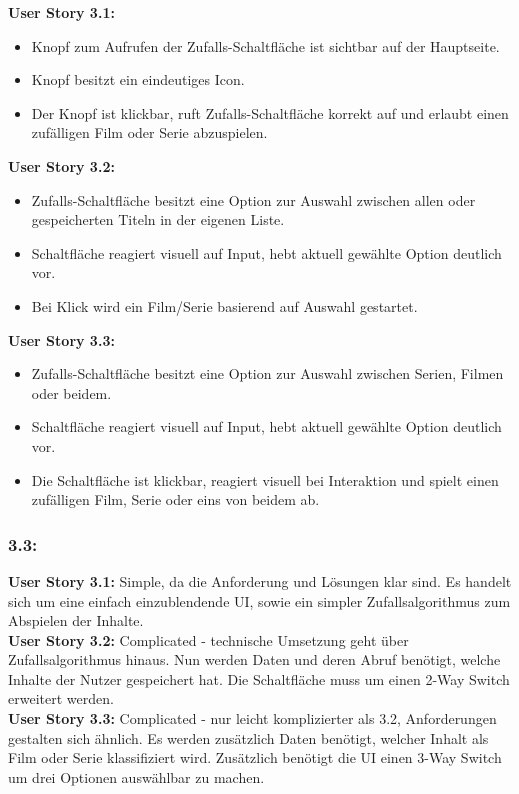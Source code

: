 \textbf{User Story 3.1:}
\begin{itemize}
\item Knopf zum Aufrufen der Zufalls-Schaltfläche ist sichtbar auf der Hauptseite.
\item Knopf besitzt ein eindeutiges Icon.
\item Der Knopf ist klickbar, ruft Zufalls-Schaltfläche korrekt auf und erlaubt einen zufälligen Film oder Serie abzuspielen.
\end{itemize}
\textbf{User Story 3.2:}
\begin{itemize}
\item Zufalls-Schaltfläche besitzt eine Option zur Auswahl zwischen allen oder gespeicherten Titeln in der eigenen Liste.
\item Schaltfläche reagiert visuell auf Input, hebt aktuell gewählte Option deutlich vor.
\item Bei Klick wird ein Film/Serie basierend auf Auswahl gestartet.
\end{itemize}
\textbf{User Story 3.3:}
\begin{itemize}
\item Zufalls-Schaltfläche besitzt eine Option zur Auswahl zwischen Serien, Filmen oder beidem.
\item Schaltfläche reagiert visuell auf Input, hebt aktuell gewählte Option deutlich vor.
\item Die Schaltfläche ist klickbar, reagiert visuell bei Interaktion und spielt einen zufälligen Film, Serie oder eins von beidem ab.
\end{itemize}

\subsubsection*{3.3:}

\textbf{User Story 3.1:} Simple, da die Anforderung und Lösungen klar sind. Es handelt sich um eine einfach einzublendende UI, sowie ein simpler Zufallsalgorithmus zum Abspielen der Inhalte.\\
\textbf{User Story 3.2:} Complicated - technische Umsetzung geht über Zufallsalgorithmus hinaus. Nun werden Daten und deren Abruf benötigt, welche Inhalte der Nutzer gespeichert hat. Die Schaltfläche muss um einen 2-Way Switch erweitert werden.\\
\textbf{User Story 3.3:} Complicated - nur leicht komplizierter als 3.2, Anforderungen gestalten sich ähnlich. Es werden zusätzlich Daten benötigt, welcher Inhalt als Film oder Serie klassifiziert wird. Zusätzlich benötigt die UI einen 3-Way Switch um drei Optionen auswählbar zu machen.